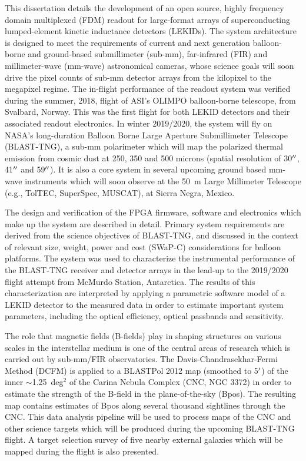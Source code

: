 This dissertation details the development of an open source, highly frequency domain multiplexed (FDM) readout for large-format arrays of superconducting lumped-element kinetic inductance detectors (LEKIDs). The system architecture is designed to meet the requirements of current and next generation balloon-borne and ground-based submillimeter (sub-mm), far-infrared (FIR) and millimeter-wave (mm-wave) astronomical cameras, whose science goals will soon drive the pixel counts of sub-mm detector arrays from the kilopixel to the megapixel regime. The in-flight performance of the readout system was verified during the summer, 2018, flight of ASI's OLIMPO balloon-borne telescope, from Svalbard, Norway. This was the first flight for both LEKID detectors and their associated readout electronics. In winter 2019/2020, the system will fly on NASA's long-duration Balloon Borne Large Aperture Submillimeter Telescope (BLAST-TNG), a sub-mm polarimeter which will map the polarized thermal emission from cosmic dust at 250, 350 and 500 microns (spatial resolution of 30$\operatorname{^{\prime\prime}}$, 41$\operatorname{^{\prime\prime}}$ and 59$\operatorname{^{\prime\prime}}$). It is also a core system in several upcoming ground based mm-wave instruments which will soon observe at the 50~m Large Millimeter Telescope (e.g., TolTEC, SuperSpec, MUSCAT), at Sierra Negra, Mexico.

The design and verification of the FPGA firmware, software and electronics which make up the system are described in detail. Primary system requirements are derived from the science objectives of BLAST-TNG, and discussed in the context of relevant size, weight, power and cost (SWaP-C) considerations for balloon platforms. The system was used to characterize the instrumental performance of the BLAST-TNG receiver and detector arrays in the lead-up to the 2019/2020 flight attempt from McMurdo Station, Antarctica. The results of this characterization are interpreted by applying a parametric software model of a LEKID detector to the measured data in order to estimate important system parameters, including the optical efficiency, optical passbands and sensitivity.

The role that magnetic fields (B-fields) play in shaping structures on various scales in the interstellar medium is one of the central areas of research which is carried out by sub-mm/FIR observatories. The Davis-Chandrasekhar-Fermi Method (DCFM) is applied to a BLASTPol 2012 map (smoothed to 5$\operatorname{^{\prime}}$) of the inner $\sim$1.25~deg$^{2}$ of the Carina Nebula Complex (CNC, NGC 3372) in order to estimate the strength of the B-field in the plane-of-the-sky (\gls{Bpos}). The resulting map contains estimates of \gls{Bpos} along several thousand sightlines through the CNC\@. This data analysis pipeline will be used to process maps of the CNC and other science targets which will be produced during the upcoming BLAST-TNG flight. A target selection survey of five nearby external galaxies which will be mapped during the flight is also presented.


